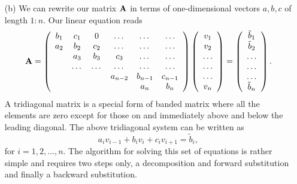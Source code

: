 \documentclass[11pt,a4wide]{article}
\begin{document}
\begin{enumerate}
\item[(b)]
We can rewrite our matrix ${\bf A}$ in terms of one-dimensional vectors $a,b,c$  
of length $1:n$. 
Our linear equation reads
\begin{equation}
    {\bf A} = \left(\begin{array}{cccccc}
                           b_1& c_1 & 0 &\dots   & \dots &\dots \\
                           a_2 & b_2 & c_2 &\dots &\dots &\dots \\
                           & a_3 & b_3 & c_3 & \dots & \dots \\
                           & \dots   & \dots &\dots   &\dots & \dots \\
                           &   &  &a_{n-2}  &b_{n-1}& c_{n-1} \\
                           &    &  &   &a_n & b_n \\
                      \end{array} \right)\left(\begin{array}{c}
                           v_1\\
                           v_2\\
                           \dots \\
                          \dots  \\
                          \dots \\
                           v_n\\
                      \end{array} \right)
  =\left(\begin{array}{c}
                           \tilde{b}_1\\
                           \tilde{b}_2\\
                           \dots \\
                           \dots \\
                          \dots \\
                           \tilde{b}_n\\
                      \end{array} \right).
\end{equation}
A tridiagonal matrix is a special form of banded matrix where all the elements are zero except for 
those on and immediately above and below the leading diagonal.
The above tridiagonal system   can be written as
\begin{equation}
  a_iv_{i-1}+b_iv_i+c_iv_{i+1} = \tilde{b}_i,
\end{equation}
for $i=1,2,\dots,n$. 
The algorithm for solving this set of equations is rather simple and requires two steps only, a decomposition 
and forward substitution and finally a backward substitution. 



\end{enumerate}
\end{document}
